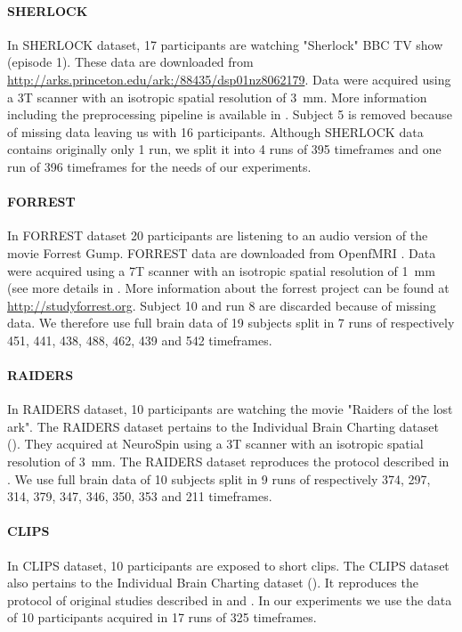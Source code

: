\paragraph{SHERLOCK}
In SHERLOCK dataset, 17 participants are watching "Sherlock" BBC TV show (episode 1). 
%
These data are downloaded from \url{http://arks.princeton.edu/ark:/88435/dsp01nz8062179}. 
%
Data were acquired using a 3T scanner with an isotropic spatial resolution of 3 mm. 
%
More information including the preprocessing pipeline is available in \cite{sherlock}.
%
Subject 5 is removed because of missing data leaving us with 16 participants.
%
Although SHERLOCK data contains originally only 1 run, we split it into 4 runs of 395 timeframes and one run of 396 timeframes for the needs of our experiments. 


\paragraph{FORREST}
In FORREST dataset 20 participants are listening to an audio version of the movie Forrest Gump.
%
FORREST data are downloaded from OpenfMRI \cite{poldrack2013toward}. 
%
Data were acquired using a 7T scanner with an isotropic spatial resolution of 1 mm (see more details in \cite{hanke2014high}.
%
More information about the forrest project can be found at \url{http://studyforrest.org}.
%
Subject 10 and run 8 are discarded because of missing data.
%
We therefore use full brain data of 19 subjects split in 7 runs of respectively 451, 441, 438, 488, 462, 439 and 542 timeframes.
 
\paragraph{RAIDERS}
In RAIDERS dataset, 10 participants are watching the movie "Raiders of the lost ark".
% 
The RAIDERS dataset pertains to the Individual Brain Charting dataset (\cite{ibc}).
% 
They acquired at NeuroSpin using a 3T scanner with an isotropic spatial resolution of 3 mm.
% 
The RAIDERS dataset reproduces the protocol described in \cite{haxby2011common}.
%
We use full brain data of 10 subjects split in 9 runs of respectively 374, 297, 314, 379, 347, 346, 350, 353 and 211 timeframes.

\paragraph{CLIPS}
In CLIPS dataset, 10 participants are exposed to short clips. 
%
The CLIPS dataset also pertains to the Individual Brain Charting dataset (\cite{ibc}).
%
It reproduces the protocol of original studies described in \cite{nishimoto2011reconstructing} and \cite{huth2012continuous}.
%
In our experiments we use the data of 10 participants acquired in 17 runs of 325 timeframes.

